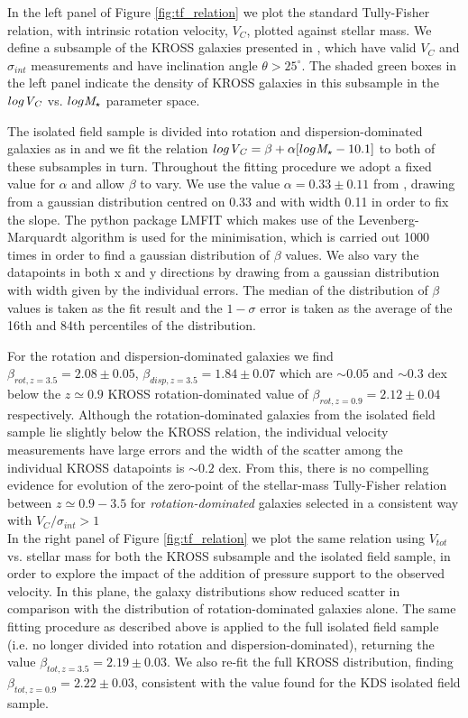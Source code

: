 \documentclass[fleqn,usenatbib]{mnras}
\begin{document}
In the left panel of Figure \ref{fig:tf_relation} we plot the standard Tully-Fisher relation, with intrinsic rotation velocity, $V_{C}$, plotted against stellar mass.
We define a subsample of the KROSS galaxies presented in \cite{Harrison2017}, which have valid $V_{C}$ and $\sigma_{int}$ measurements and have inclination angle $\theta > 25^{\circ}$.
The shaded green boxes in the left panel indicate the density of KROSS galaxies in this subsample in the $log{\it V_{C}}$ vs. $log{\it M_{\star}}$ parameter space.

The isolated field sample is divided into rotation and dispersion-dominated galaxies as in \cite{Turner2017} and we fit the relation $log{\it V_{C}} = \beta + \alpha[log{\it M_{\star}} - 10.1]$ \citep[e.g.][]{Reyes2011,Harrison2017} to both of these subsamples in turn.
Throughout the fitting procedure we adopt a fixed value for $\alpha$ and allow $\beta$ to vary.
We use the value $\alpha=0.33\pm0.11$ from \cite{Harrison2017}, drawing from a gaussian distribution centred on 0.33 and with width 0.11 in order to fix the slope.
The python package {\scriptsize LMFIT} \citep{Newville2014} which makes use of the Levenberg-Marquardt algorithm is used for the minimisation, which is carried out 1000 times in order to find a gaussian distribution of $\beta$ values.
We also vary the datapoints in both x and y directions by drawing from a gaussian distribution with width given by the individual errors. 
The median of the distribution of $\beta$ values is taken as the fit result and the $1-\sigma$ error is taken as the average of the 16th and 84th percentiles of the distribution.

For the rotation and dispersion-dominated galaxies we find $\beta_{rot,z=3.5} = 2.08\pm0.05$, $\beta_{disp,z=3.5} = 1.84\pm0.07$ which are $\sim0.05$ and $\sim0.3$ dex below the $z\simeq0.9$ KROSS rotation-dominated value of $\beta_{rot,z=0.9} = 2.12\pm0.04$ \citep{Harrison2017} respectively.
Although the rotation-dominated galaxies from the isolated field sample lie slightly below the KROSS relation, the individual velocity measurements have large errors and the width of the scatter among the individual KROSS datapoints is $\sim0.2$ dex.
From this, there is no compelling evidence for evolution of the zero-point of the stellar-mass Tully-Fisher relation between $z\simeq0.9-3.5$ for {\it rotation-dominated} galaxies selected in a consistent way with $V_{C}/\sigma_{int} > 1$ \\

\noindent
In the right panel of Figure \ref{fig:tf_relation} we plot the same relation using $V_{tot}$ vs. stellar mass for both the KROSS subsample and the isolated field sample, in order to explore the impact of the addition of pressure support to the observed velocity.
In this plane, the galaxy distributions show reduced scatter in comparison with the distribution of rotation-dominated galaxies alone.
The same fitting procedure as described above is applied to the full isolated field sample (i.e. no longer divided into rotation and dispersion-dominated), returning the value $\beta_{tot,z=3.5} = 2.19\pm0.03$.
We also re-fit the full KROSS distribution, finding $\beta_{tot,z=0.9} = 2.22\pm0.03$, consistent with the value found for the KDS isolated field sample.
\end{document}
